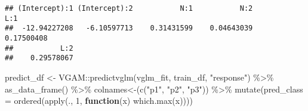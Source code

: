 \documentclass[
]{book}
\newenvironment{Shaded}{\begin{snugshade}}{\end{snugshade}}
\newcommand{\AttributeTok}[1]{\textcolor[rgb]{0.77,0.63,0.00}{#1}}
\newcommand{\ControlFlowTok}[1]{\textcolor[rgb]{0.13,0.29,0.53}{\textbf{#1}}}
\newcommand{\DecValTok}[1]{\textcolor[rgb]{0.00,0.00,0.81}{#1}}
\newcommand{\FunctionTok}[1]{\textcolor[rgb]{0.00,0.00,0.00}{#1}}
\newcommand{\NormalTok}[1]{#1}
\newcommand{\OtherTok}[1]{\textcolor[rgb]{0.56,0.35,0.01}{#1}}
\newcommand{\SpecialCharTok}[1]{\textcolor[rgb]{0.00,0.00,0.00}{#1}}
\newcommand{\StringTok}[1]{\textcolor[rgb]{0.31,0.60,0.02}{#1}}
\begin{document}
\begin{verbatim}
## (Intercept):1 (Intercept):2           N:1           N:2           L:1 
##  -12.94227208   -6.10597713    0.31431599    0.04643039    0.17500408 
##           L:2 
##    0.29578067
\end{verbatim}

\begin{Shaded}
\begin{Highlighting}[]
\NormalTok{predict\_df }\OtherTok{\textless{}{-}}\NormalTok{ VGAM}\SpecialCharTok{::}\FunctionTok{predictvglm}\NormalTok{(vglm\_fit, train\_df, }\StringTok{"response"}\NormalTok{) }\SpecialCharTok{\%\textgreater{}\%} 
  \FunctionTok{as\_data\_frame}\NormalTok{() }\SpecialCharTok{\%\textgreater{}\%}
  \StringTok{\textasciigrave{}}\AttributeTok{colnames\textless{}{-}}\StringTok{\textasciigrave{}}\NormalTok{(}\FunctionTok{c}\NormalTok{(}\StringTok{"p1"}\NormalTok{, }\StringTok{"p2"}\NormalTok{, }\StringTok{"p3"}\NormalTok{)) }\SpecialCharTok{\%\textgreater{}\%}
  \FunctionTok{mutate}\NormalTok{(}\AttributeTok{pred\_class =} \FunctionTok{ordered}\NormalTok{(}\FunctionTok{apply}\NormalTok{(., }\DecValTok{1}\NormalTok{, }\ControlFlowTok{function}\NormalTok{(x) }\FunctionTok{which.max}\NormalTok{(x))))}


\end{Highlighting}
\end{Shaded}
\end{document}
